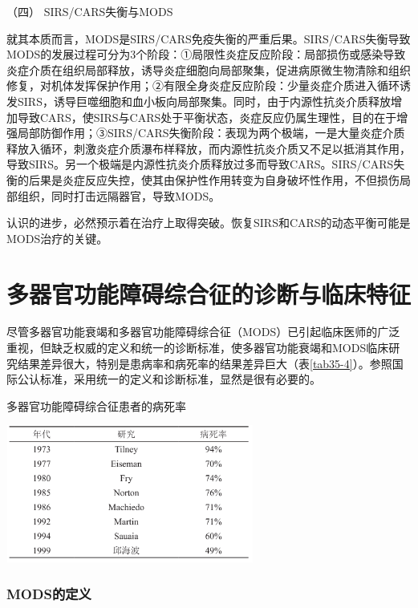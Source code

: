 \hypertarget{text00093.htmlux5cux23CHP3-11-2-4-4}{}
（四） SIRS/CARS失衡与MODS

就其本质而言，MODS是SIRS/CARS免疫失衡的严重后果。SIRS/CARS失衡导致MODS的发展过程可分为3个阶段：①局限性炎症反应阶段：局部损伤或感染导致炎症介质在组织局部释放，诱导炎症细胞向局部聚集，促进病原微生物清除和组织修复，对机体发挥保护作用；②有限全身炎症反应阶段：少量炎症介质进入循环诱发SIRS，诱导巨噬细胞和血小板向局部聚集。同时，由于内源性抗炎介质释放增加导致CARS，使SIRS与CARS处于平衡状态，炎症反应仍属生理性，目的在于增强局部防御作用；③SIRS/CARS失衡阶段：表现为两个极端，一是大量炎症介质释放入循环，刺激炎症介质瀑布样释放，而内源性抗炎介质又不足以抵消其作用，导致SIRS。另一个极端是内源性抗炎介质释放过多而导致CARS。SIRS/CARS失衡的后果是炎症反应失控，使其由保护性作用转变为自身破坏性作用，不但损伤局部组织，同时打击远隔器官，导致MODS。

认识的进步，必然预示着在治疗上取得突破。恢复SIRS和CARS的动态平衡可能是MODS治疗的关键。

\protect\hypertarget{text00094.html}{}{}

\section{多器官功能障碍综合征的诊断与临床特征}

尽管多器官功能衰竭和多器官功能障碍综合征（MODS）已引起临床医师的广泛重视，但缺乏权威的定义和统一的诊断标准，使多器官功能衰竭和MODS临床研究结果差异很大，特别是患病率和病死率的结果差异巨大（表\ref{tab35-4}）。参照国际公认标准，采用统一的定义和诊断标准，显然是很有必要的。

\begin{table}[htbp]
\centering
\caption{多器官功能障碍综合征患者的病死率}
\label{tab35-4}
\includegraphics[width=3.20833in,height=1.78125in]{./images/Image00136.jpg}
\end{table}

\subsubsection{MODS的定义}

